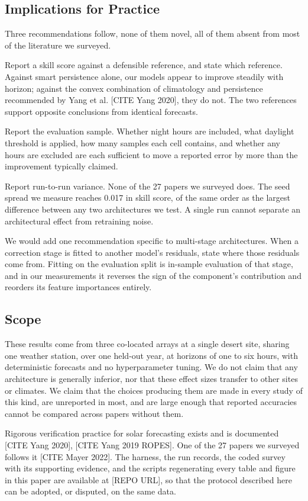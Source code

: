 \subsection{Implications for Practice}

Three recommendations follow, none of them novel, all of them absent
from most of the literature we surveyed.

Report a skill score against a defensible reference, and state which
reference. Against smart persistence alone, our models appear to improve
steadily with horizon; against the convex combination of climatology and
persistence recommended by Yang et al. [CITE Yang 2020], they do not.
The two references support opposite conclusions from identical
forecasts.

Report the evaluation sample. Whether night hours are included, what
daylight threshold is applied, how many samples each cell contains, and
whether any hours are excluded are each sufficient to move a reported
error by more than the improvement typically claimed.

Report run-to-run variance. None of the 27 papers we surveyed does. The
seed spread we measure reaches 0.017 in skill score, of the same order
as the largest difference between any two architectures we test. A
single run cannot separate an architectural effect from retraining
noise.

We would add one recommendation specific to multi-stage architectures.
When a correction stage is fitted to another model's residuals, state
where those residuals come from. Fitting on the evaluation split is
in-sample evaluation of that stage, and in our measurements it reverses
the sign of the component's contribution and reorders its feature
importances entirely.

\subsection{Scope}

These results come from three co-located arrays at a single desert site,
sharing one weather station, over one held-out year, at horizons of one
to six hours, with deterministic forecasts and no hyperparameter tuning.
We do not claim that any architecture is generally inferior, nor that
these effect sizes transfer to other sites or climates. We claim that
the choices producing them are made in every study of this kind, are
unreported in most, and are large enough that reported accuracies cannot
be compared across papers without them.

Rigorous verification practice for solar forecasting exists and is
documented [CITE Yang 2020], [CITE Yang 2019 ROPES]. One of the 27
papers we surveyed follows it [CITE Mayer 2022]. The harness, the run
records, the coded survey with its supporting evidence, and the scripts
regenerating every table and figure in this paper are available at
[REPO URL], so that the protocol described here can be adopted, or
disputed, on the same data.

